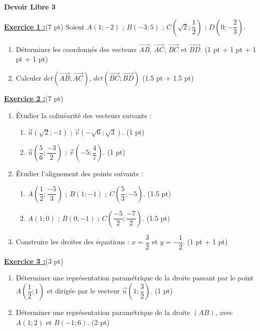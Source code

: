 \documentclass[12pt,a4paper]{article}
\begin{document}
\pagestyle{fancy}
\fancyhf{} %
\fancyfoot[C]{\thepage} %


\begin{center}
    \textbf{\Large  Devoir Libre 3}
\end{center}

\underline{\large\textbf{Exercice 1 :}}(7 pt)
Soient $A(1;-2)$ ; $B(-3;5)$ ; $C\left(\sqrt{2}; \dfrac{1}{2}\right)$ ; $D(0;-\dfrac{2}{3})$.
\begin{enumerate}
	\item Déterminer les coordonnés des vecteurs $\overrightarrow{AB}$, $\overrightarrow{AC}$, $\overrightarrow{BC}$ et $\overrightarrow{BD}$. (1 pt + 1 pt + 1 pt + 1 pt)
	\item Calculer $det(\overrightarrow{AB}; \overrightarrow{AC})$, $det(\overrightarrow{BC}; \overrightarrow{BD})$ (1.5 pt + 1.5 pt)
\end{enumerate}

\underline{\large\textbf{Exercice 2 :}}(7 pt)
\begin{enumerate}
	\item Étudier la colinéarité des vecteurs suivants :
		\begin{enumerate}
			\item $\vec{u}(\sqrt{2};-1)$ ; $\vec{v}(-\sqrt{6}; \sqrt{3})$. (1 pt)
			\item $\vec{u}\left(\dfrac{5}{6};\dfrac{-3}{2}\right)$ ; $\vec{v}\left(-5; \dfrac{4}{7}\right)$. (1 pt)
		\end{enumerate}
	\item Étudier l'alignement des points suivants :
		\begin{enumerate}
			\item $A\left(\dfrac{1}{2};\dfrac{-5}{3}\right)$ ; $B(1;-1)$ ; $C\left(\dfrac{5}{3};-5\right)$. (1.5 pt)
			\item $A(1;0)$ ; $B(0;-1)$ ; $C\left(\dfrac{-5}{2};\dfrac{-7}{2}\right)$. (1.5 pt)
		\end{enumerate}
	\item Construire les droites des équations : $x = \dfrac{3}{2}$ et $y = -\dfrac{1}{2}$. (1 pt + 1 pt)
\end{enumerate}

\underline{\large\textbf{Exercice 3 :}}(3 pt)
\begin{enumerate}
	\item Déterminer une représentation paramétrique de la droite passant par le point $A\left(\dfrac{1}{2}; 1\right)$ et dirigée par le vecteur $\vec{u}\left(1;\dfrac{3}{2}\right)$. (1 pt)
	\item Déterminer une représentation paramétrique de la droite $(AB)$, avec $A(1;2)$ et $B(-1;6)$. (2 pt)
\end{enumerate}
\end{document}
